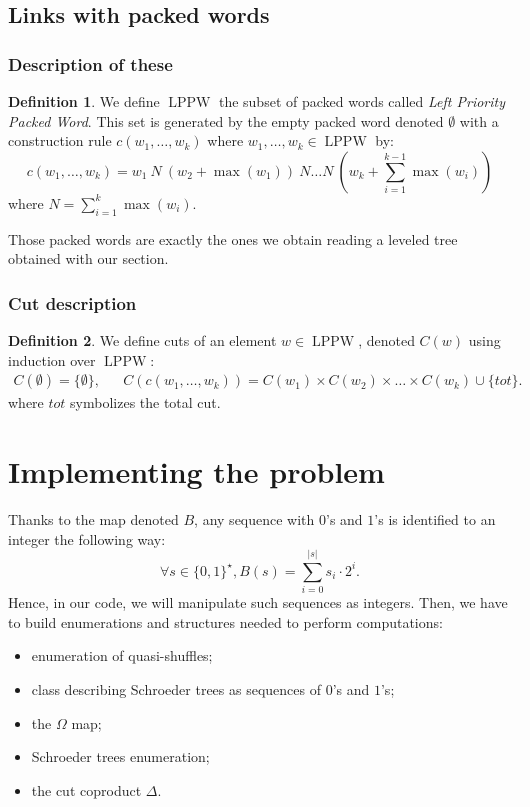 \documentclass[a4paper,10pt]{amsart}
\DeclareMathOperator{\LPPW}{LPPW}
\newcommand{\Schw}{Schroeder} %
\theoremstyle{definition}
\newtheorem{defi}{Definition}
\begin{document}
\subsection{Links with packed words}

\subsubsection{Description of these}

\begin{defi}
	We define $\LPPW$ the subset of packed words called \emph{Left Priority Packed Word}. This set is generated by the empty packed word denoted $\emptyset$ with a construction rule $c(w_1,\dots,w_k)$ where $w_1,\dots, w_k\in\LPPW$ by:
	\[
	c(w_1,\dots,w_k) = w_1~N~ (w_2 + \max(w_1))~N \dots N~ (w_k+\sum_{i=1}^{k-1} \max(w_i))
	\]
	where $N=\sum_{i=1}^{k} \max(w_i)$.
\end{defi}

Those packed words are exactly the ones we obtain reading a leveled tree obtained with our section.

\subsubsection{Cut description}

\begin{defi}
	We define cuts of an element $w\in\LPPW$, denoted $C(w)$ using induction over $\LPPW$:
	\begin{align*}
		C(\emptyset)=\{\emptyset\}, && C(c(w_1,\dots,w_k))=C(w_1)\times C(w_2)\times \dots \times C(w_k) \cup \{ tot \}. 
	\end{align*}
	where $tot$ symbolizes the total cut.
\end{defi}

\section{Implementing the problem} \label{sec:coding}
Thanks to the map denoted $B$, any sequence with $0$'s and $1$'s is identified to an integer the following way:
\[
\forall s\in \{0,1\}^{\star}, B(s)=\sum^{|s|}_{i=0} s_i\cdot 2^i.
\]
Hence, in our code, we will manipulate such sequences as integers. Then, we have to build enumerations and structures needed to perform computations:
\begin{itemize}
	\item enumeration of quasi-shuffles;
	\item class describing \Schw{} trees as sequences of $0$'s and $1$'s;
	\item the $\Omega$ map;
	\item \Schw{} trees enumeration;
	\item the cut coproduct $\Delta$.
\end{itemize}
\end{document}
